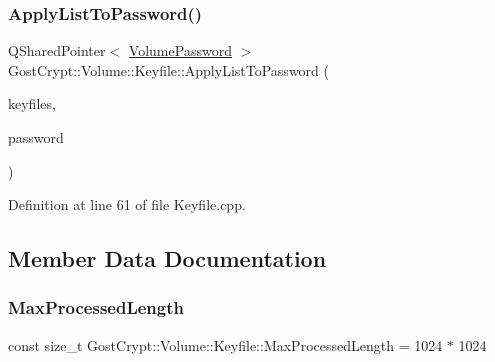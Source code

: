 \mbox{\label{class_gost_crypt_1_1_volume_1_1_keyfile_a1493100ce01d801c5f11aa66f324efcf}} 
\subsubsection{\texorpdfstring{Apply\+List\+To\+Password()}{ApplyListToPassword()}}
{\footnotesize\ttfamily Q\+Shared\+Pointer$<$ \hyperlink{class_gost_crypt_1_1_volume_1_1_volume_password}{Volume\+Password} $>$ Gost\+Crypt\+::\+Volume\+::\+Keyfile\+::\+Apply\+List\+To\+Password (\begin{DoxyParamCaption}\item[{Q\+Shared\+Pointer$<$ \hyperlink{namespace_gost_crypt_1_1_volume_af2dce083ae31a8d22257d609e924963d}{Keyfile\+List} $>$}]{keyfiles,  }\item[{Q\+Shared\+Pointer$<$ \hyperlink{class_gost_crypt_1_1_volume_1_1_volume_password}{Volume\+Password} $>$}]{password }\end{DoxyParamCaption})\hspace{0.3cm}{\ttfamily [static]}}



Definition at line 61 of file Keyfile.\+cpp.



\subsection{Member Data Documentation}
\mbox{\label{class_gost_crypt_1_1_volume_1_1_keyfile_a3ba0bae9093d388569e2e6652fdd22fb}} 
\subsubsection{\texorpdfstring{Max\+Processed\+Length}{MaxProcessedLength}}
{\footnotesize\ttfamily const size\+\_\+t Gost\+Crypt\+::\+Volume\+::\+Keyfile\+::\+Max\+Processed\+Length = 1024 $\ast$ 1024\hspace{0.3cm}{\ttfamily [static]}}



